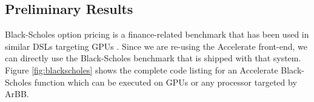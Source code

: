 \subsection{Preliminary Results}









Black-Scholes option pricing is a finance-related benchmark that has been used in similar
DSLs targeting GPUs \cite{ACCELERATEDAMP11, NIKOLA}. Since we are re-using the 
Accelerate front-end, we can directly use the Black-Scholes benchmark that 
is shipped with that system.  Figure \ref{fig:blackscholes} shows the
complete code listing for an Accelerate Black-Scholes function which
can be executed on GPUs or any processor targeted by ArBB.

%


